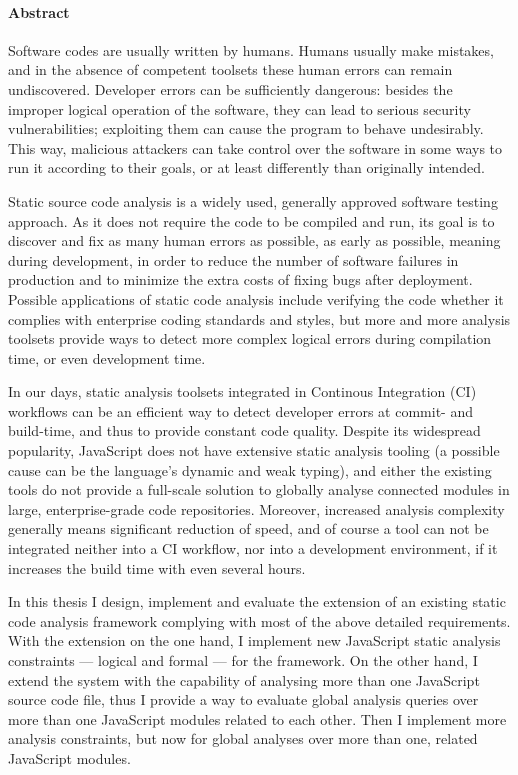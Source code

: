 \clearpage

\paragraph*{Abstract}
{}
\thispagestyle{plain}

	Software codes are usually written by humans. Humans usually make mistakes, and in the absence of competent toolsets these human errors can remain undiscovered. Developer errors can be sufficiently dangerous: besides the improper logical operation of the software, they can lead to serious security vulnerabilities; exploiting them can cause the program to behave undesirably. This way, malicious attackers can take control over the software in some ways to run it according to their goals, or at least differently than originally intended.

	Static source code analysis is a widely used, generally approved software testing approach. As it does not require the code to be compiled and run, its goal is to discover and fix as many human errors as possible, as early as possible, meaning during development, in order to reduce the number of software failures in production and to minimize the extra costs of fixing bugs after deployment. Possible applications of static code analysis include verifying the code whether it complies with enterprise coding standards and styles, but more and more analysis toolsets provide ways to detect more complex logical errors during compilation time, or even development time.

	In our days, static analysis toolsets integrated in Continous Integration (CI) workflows can be an efficient way to detect developer errors at commit- and build-time, and thus to provide constant code quality. Despite its widespread popularity, JavaScript does not have extensive static analysis tooling (a possible cause can be the language's dynamic and weak typing), and either the existing tools do not provide a full-scale solution to globally analyse connected modules in large, enterprise-grade code repositories. Moreover, increased analysis complexity generally means significant reduction of speed, and of course a tool can not be integrated neither into a CI workflow, nor into a development environment, if it increases the build time with even several hours.

	In this thesis I design, implement and evaluate the extension of an existing static code analysis framework complying with most of the above detailed requirements. With the extension on the one hand, I implement new JavaScript static analysis constraints — logical and formal — for the framework. On the other hand, I extend the system with the capability of analysing more than one JavaScript source code file, thus I provide a way to evaluate global analysis queries over more than one JavaScript modules related to each other. Then I implement more analysis constraints, but now for global analyses over more than one, related JavaScript modules.


